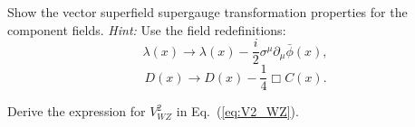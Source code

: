 \documentclass[notes.tex]{subfiles}
\begin{document}
\begin{Exercise}
Show the vector superfield supergauge transformation properties for the component fields. {\it Hint:} Use the field redefinitions:
\[\lambda(x) \to \lambda(x) -\frac{i}{2}\sigma^\mu\partial_\mu\bar{\phi}(x),\]
\[D(x) \to D(x) - \frac{1}{4}\Box C(x).\]
\end{Exercise}

\begin{Exercise}
Derive the expression for $V_{WZ}^2$ in Eq.~(\ref{eq:V2_WZ}).
\end{Exercise}

%
%
%
\end{document}
